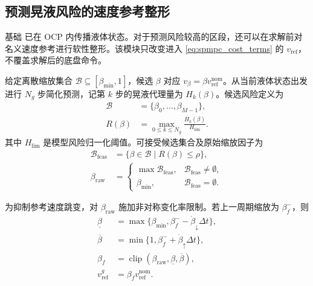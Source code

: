 \subsection{预测晃液风险的速度参考整形}

基础 \SPMPC{} 已在 OCP 内传播液体状态。对于预测风险较高的区段，还可以在求解前对名义速度参考进行软性整形。该模块只改变进入 \cref{eq:spmpc_cost_terms} 的 $v_{\mathrm{ref}}$，不覆盖求解后的底盘命令。

给定离散缩放集合 $\mathcal{B}\subseteq[\beta_{\min},1]$，候选 $\beta$ 对应 $v_{\beta}=\beta v_{\mathrm{ref}}^{\mathrm{nom}}$。从当前液体状态出发进行 $N_g$ 步简化预测，记第 $k$ 步的晃液代理量为 $H_k(\beta)$。候选风险定义为
\begin{equation}
\begin{aligned}
  \mathcal{B}&=\{\beta_0,\ldots,\beta_{M-1}\},\\
  R(\beta)&=
  \max_{0\leq k\leq N_g}
  \frac{H_k(\beta)}{H_{\lim}} .
\end{aligned}
\label{eq:shaper_risk}
\end{equation}
其中 $H_{\lim}$ 是模型风险归一化阈值。可接受候选集合及原始缩放因子为
\begin{equation}
\begin{aligned}
  \mathcal{B}_{\mathrm{feas}}
  &=\{\beta\in\mathcal{B}\mid R(\beta)\leq\rho\},\\
  \beta_{\mathrm{raw}}
  &=
  \begin{cases}
    \max\mathcal{B}_{\mathrm{feas}},
      &\mathcal{B}_{\mathrm{feas}}\neq\emptyset,\\
    \beta_{\min},
      &\mathcal{B}_{\mathrm{feas}}=\emptyset .
  \end{cases}
\end{aligned}
\label{eq:shaper_selection}
\end{equation}

为抑制参考速度跳变，对 $\beta_{\mathrm{raw}}$ 施加非对称变化率限制。若上一周期缩放为 $\beta_f^{-}$，则
\begin{equation}
\begin{aligned}
  \underline{\beta}
  &=\max\{\beta_{\min},
    \beta_f^{-}-\dot{\beta}_{\downarrow}\Delta t\},\\
  \overline{\beta}
  &=\min\{1,
    \beta_f^{-}+\dot{\beta}_{\uparrow}\Delta t\},\\
  \beta_f
  &=\operatorname{clip}
    (\beta_{\mathrm{raw}},\underline{\beta},\overline{\beta}),\\
  v_{\mathrm{ref}}^{g}
  &=\beta_f v_{\mathrm{ref}}^{\mathrm{nom}}.
\end{aligned}
\label{eq:shaper_filter}
\end{equation}

